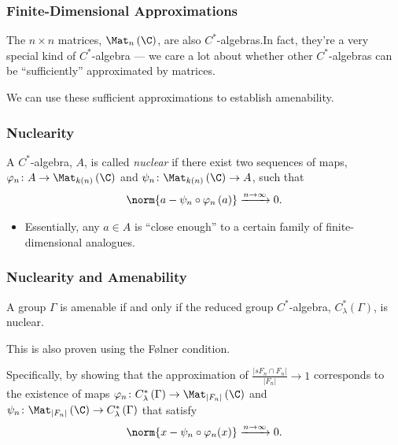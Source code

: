 \documentclass{beamer-custom}
\begin{document}
\begin{frame}
  \frametitle{Finite-Dimensional Approximations}
  The $n\times n$ matrices, $\Mat_n\left( \C \right)$, are also $C^{\ast}$-algebras.\pause\:In fact, they're a very special kind of $C^{\ast}$-algebra --- we care a lot about whether other $C^{\ast}$-algebras can be ``sufficiently'' approximated by matrices.\pause\newline

  We can use these sufficient approximations to establish amenability.
\end{frame}
\begin{frame}
  \frametitle{Nuclearity}
  A $C^{\ast}$-algebra, $A$, is called \textit{nuclear} if there exist two sequences of maps, $\varphi_n\colon A\rightarrow \Mat_{k(n)}\left( \C \right)$ and $\psi_n\colon \Mat_{k(n)}\left( \C \right)\rightarrow A$, such that
  \begin{align*}
    \norm{a - \psi_n\circ\varphi_n\left( a \right)} \xrightarrow{n\rightarrow\infty} 0.
  \end{align*}\pause
  \begin{itemize}
    \item Essentially, any $a\in A$ is ``close enough'' to a certain family of finite-dimensional analogues.
  \end{itemize}
\end{frame}
\begin{frame}
  \frametitle{Nuclearity and Amenability}
  A group $\Gamma$ is amenable if and only if the reduced group $C^{\ast}$-algebra, $C^{\ast}_{\lambda}\left( \Gamma \right)$, is nuclear.\pause\newline

  This is also proven using the Følner condition.\pause\newline

  Specifically, by showing that the approximation of $\frac{\left\vert sF_n\cap F_n \right\vert}{\left\vert F_n \right\vert} \rightarrow 1$ corresponds to the existence of maps $\varphi_n\colon C^{\ast}_{\lambda}\left( \Gamma \right)\rightarrow \Mat_{\left\vert F_n \right\vert}\left( \C \right)$ and $\psi_n\colon \Mat_{\left\vert F_n \right\vert}\left( \C \right)\rightarrow C^{\ast}_{\lambda}\left( \Gamma \right)$ that satisfy
  \begin{align*}
    \norm{x - \psi_n\circ\varphi_n(x)}\xrightarrow{n\rightarrow\infty} 0.
  \end{align*}
\end{frame}
\end{document}
